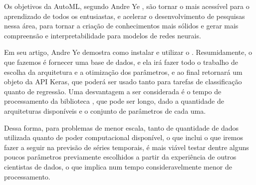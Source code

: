 Os objetivos da AutoML, segundo Andre Ye \citep{automl}, são tornar o  mais acessível para o aprendizado de todos os entusiastas, e acelerar o desenvolvimento de pesquisas nessa área, para tornar a criação de conhecimentos mais sólidos e gerar mais compreensão e interpretabilidade para modelos de redes neurais.

Em seu artigo, Andre Ye \citep{automl} demostra como instalar e utilizar o . Resumidamente, o que fazemos é fornecer uma base de dados, e ela irá fazer todo o trabalho de escolha da arquitetura e a otimização dos parâmetros, e ao final retornará um objeto da API Keras, que poderá ser usado tanto para tarefas de classificação quanto de regressão. Uma desvantagem a ser considerada é o tempo de processamento da biblioteca , que pode ser longo, dado a quantidade de arquiteturas disponíveis e o conjunto de parâmetros de cada uma. 

Dessa forma, para problemas de menor escala, tanto de quantidade de dados utilizada quanto de poder computacional disponível, o que inclui o que iremos fazer a seguir na previsão de séries temporais, é mais viável testar dentre alguns poucos parâmetros previamente escolhidos a partir da experiência de outros cientistas de dados, o que implica num tempo consideravelmente menor de processamento.
